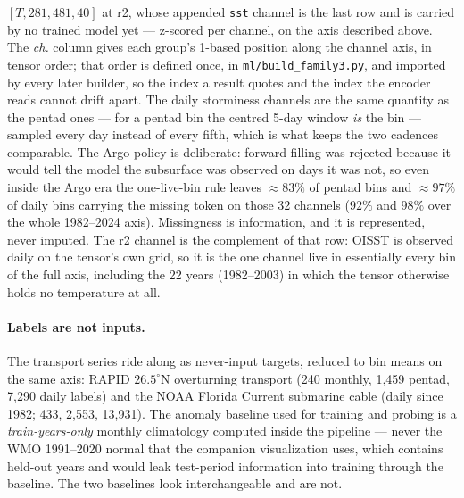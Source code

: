 \documentclass[10pt]{article}
\begin{document}
\begin{table}[p]
{$[T,281,481,40]$ at r2, whose appended \texttt{sst} channel is the last
row and is carried by no trained model yet --- z-scored per channel, on
the axis described above. The \emph{ch.} column gives each group's
1-based position along the channel axis, in tensor order; that order is
defined once, in \texttt{ml/build\_family3.py}, and imported by every
later builder, so the index a result quotes and the index the encoder
reads cannot drift apart. The daily storminess channels are
the same quantity as the pentad ones --- for a pentad bin the centred
5-day window \emph{is} the bin --- sampled every day instead of every
fifth, which is what keeps the two cadences comparable. The Argo
policy is deliberate: forward-filling was rejected because it would
tell the model the subsurface was observed on days it was not, so even
inside the Argo era the one-live-bin rule leaves $\approx83\%$ of
pentad bins and $\approx97\%$ of daily bins carrying the missing token
on those 32 channels ($92\%$ and $98\%$ over the whole
1982--2024 axis). Missingness is information, and it is represented,
never imputed. The r2 channel is the complement of that row: OISST is
observed daily on the tensor's own grid, so it is the one channel live in
essentially every bin of the full axis, including the 22 years
(1982--2003) in which the tensor otherwise holds no temperature at all.}
\label{tab:inputdata}
\end{table}

\paragraph{Labels are not inputs.} The transport series ride along as
never-input targets, reduced to bin means on the same axis: RAPID
$26.5^\circ$N overturning transport (240 monthly, 1{,}459 pentad,
7{,}290 daily labels) and the NOAA Florida Current submarine cable
(daily since 1982; 433, 2{,}553, 13{,}931). The anomaly baseline used
for training and probing is a \emph{train-years-only} monthly
climatology computed inside the pipeline --- never the WMO 1991--2020
normal that the companion visualization uses, which contains held-out
years and would leak test-period information into training through the
baseline. The two baselines look interchangeable and are not.
\end{document}
